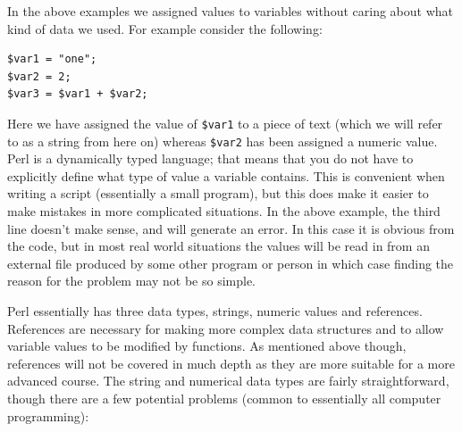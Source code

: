\documentclass[11pt]{article}
\begin{document}
In the above examples we assigned values to variables without caring
about what kind of data we used. For example consider the following:

\begin{verbatim}
$var1 = "one";
$var2 = 2;
$var3 = $var1 + $var2;
\end{verbatim}

Here we have assigned the value of \texttt{\$var1} to a piece of text (which we
will refer to as a string from here on) whereas \texttt{\$var2} has been
assigned a numeric value. Perl is a dynamically typed language; that
means that you do not have to explicitly define what type of value a
variable contains. This is convenient when writing a script (essentially
a small program), but this does make it easier to make mistakes in more
complicated situations. In the above example, the third line doesn't
make sense, and will generate an error. In this case it is obvious from
the code, but in most real world situations the values will be read in
from an external file produced by some other program or person in which
case finding the reason for the problem may not be so simple.

Perl essentially has three data types, strings, numeric values and
references. References are necessary for making more complex data
structures and to allow variable values to be modified by functions. As
mentioned above though, references will not be covered in much depth as
they are more suitable for a more advanced course. The string and
numerical data types are fairly straightforward, though there are a few
potential problems (common to essentially all computer programming):
\end{document}
